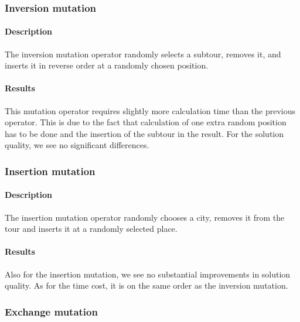 ﻿\documentclass[a4paper,english,11pt,]{scrartcl}
\begin{document}
\subsubsection{Inversion mutation}
% 
\paragraph{Description}
The inversion mutation operator randomly selects a subtour, removes it, and inserts it in reverse order at a randomly chosen position.

\paragraph{Results}
This mutation operator requires slightly more calculation time than the previous operator. This is due to the fact that calculation of one extra random position has to be done and the insertion of the subtour in the result.
For the solution quality, we see no significant differences.




\subsubsection{Insertion mutation}
% 
\paragraph{Description}
The insertion mutation operator randomly chooses a city, removes it from the tour and inserts it at a randomly selected place. 



\paragraph{Results}
Also for the insertion mutation, we see no substantial improvements in solution quality. As for the time cost, it is on the same order as the inversion mutation.


\subsubsection{Exchange mutation}
% 
\end{document}

